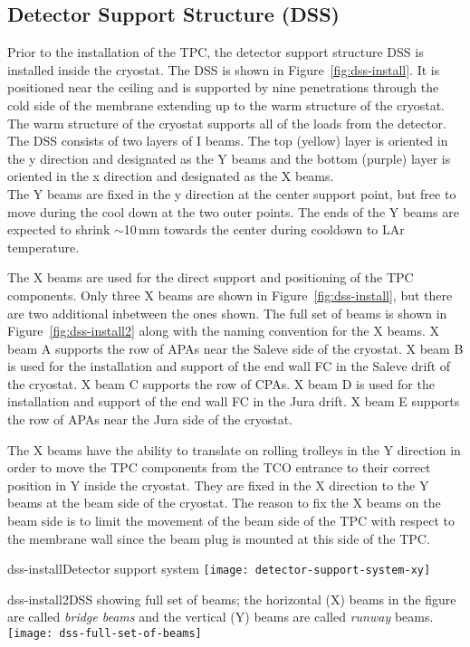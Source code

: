 \subsection{Detector Support Structure (DSS)}


Prior to the installation of the TPC, the detector support structure DSS is installed inside the cryostat.  The DSS is shown in Figure~\ref{fig:dss-install}.  It is positioned near the ceiling and is supported by nine penetrations through the cold side of the membrane extending up to the warm structure of the cryostat.  The warm structure of the cryostat supports all of the loads from the detector.  The DSS consists of two layers of I beams.  The top (yellow) layer is oriented in the y direction and designated as the Y beams and the bottom (purple) layer is oriented in the x direction and designated as the X beams. \\
The Y beams are fixed in the y direction at the center support point, but free to move during the cool down at the two outer points.  The ends of the Y beams are expected to shrink $\sim$10\,mm towards the center during cooldown to LAr temperature.  

The X beams are used for the direct support and positioning of the TPC components.  Only three X beams are shown in Figure~\ref{fig:dss-install}, but there are two additional inbetween the ones shown.  
The full set of beams is shown in Figure~\ref{fig:dss-install2} along with the naming convention for the X beams.
 X beam A supports the row of APAs near the Saleve side of the cryostat.  X beam B is used for the installation and support of the end wall FC in the Saleve drift of the cryostat.  X beam C supports the row of CPAs.  X beam D is used for the installation and support of the end wall FC in the Jura drift.  X beam E supports the row of APAs near the Jura side of the cryostat.  

The X beams have the ability to translate on rolling trolleys in the Y direction in order to move the TPC components from the TCO entrance to their correct position in Y inside the cryostat.  They are fixed in the X direction to the Y beams at the beam side of the cryostat.  The reason 
to fix the X beams on the beam side is to limit the movement of the beam side of the TPC with respect to the membrane wall since
the beam plug is mounted at this side of the TPC.  

\begin{cdrfigure}{dss-install}{Detector support system}
\texttt{[image: detector-support-system-xy]}
\end{cdrfigure}

\begin{cdrfigure}{dss-install2}{DSS showing full set of beams; the horizontal (X) beams in the figure are called \textit{bridge beams} and the vertical (Y) beams are called \textit{runway} beams. }
 \texttt{[image: dss-full-set-of-beams]}
\end{cdrfigure}

